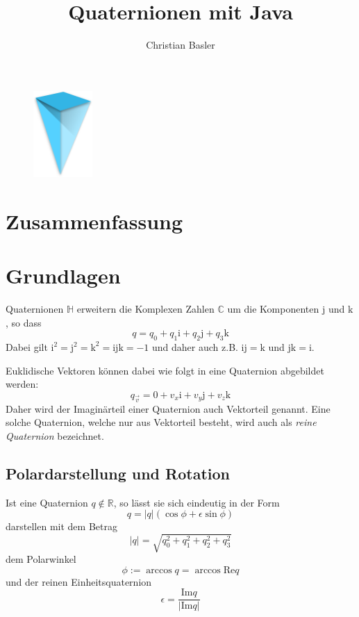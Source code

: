 \documentclass[12pt]{article}
\title{Quaternionen mit Java}
\author{Christian Basler}
\date{}
\begin{document}
  \maketitle

\begin{figure}[h]
\includegraphics[width=0.2\textwidth]{logo.png}
\centering
\end{figure}

  \tableofcontents

  \section{Zusammenfassung}



  \section{Grundlagen}

  Quaternionen $\mathbb{H}$ erweitern die Komplexen Zahlen $\mathbb{C}$ um die Komponenten $\mathrm{j}$ und $\mathrm{k}$, so dass
  $$ q = q_0 + q_1 \mathrm{i} + q_2 \mathrm{j} + q_3 \mathrm{k} $$
  Dabei gilt $\mathrm{i}^2 = \mathrm{j}^2 = \mathrm{k}^2 = \mathrm{i}\mathrm{j}\mathrm{k} = -1$ und daher auch z.B. $\mathrm{i}\mathrm{j} = \mathrm{k}$ und $\mathrm{j}\mathrm{k} = \mathrm{i}$.

  Euklidische Vektoren können dabei wie folgt in eine Quaternion abgebildet werden:
  $$ q_{\vec{v}} = 0 + v_x \mathrm{i} + v_y \mathrm{j} + v_z \mathrm{k} $$
  Daher wird der Imaginärteil einer Quaternion auch Vektorteil genannt. Eine solche Quaternion, welche nur aus Vektorteil besteht, wird auch als \textit{reine Quaternion} bezeichnet.


  \subsection{Polardarstellung und Rotation}

  Ist eine Quaternion $q \notin \mathbb{R}$, so lässt sie sich eindeutig in der Form
  $$ q = \lvert q \rvert (\cos{\phi} + \epsilon \sin{\phi}) $$
  darstellen mit dem Betrag
  $$ \lvert q \rvert = \sqrt{q_0^2 + q_1^2 + q_2^2 + q_3^2} $$
  dem Polarwinkel
  $$ \phi := \arccos{q} = \arccos{\mathrm{Re} q} $$
  und der reinen Einheitsquaternion
  $$ \epsilon = \frac{\mathrm{Im} q}{\lvert \mathrm{Im} q \rvert} $$
\end{document}
